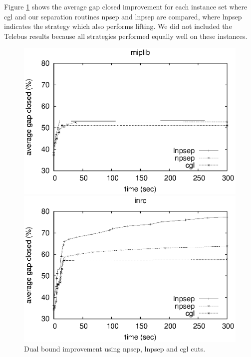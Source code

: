 \documentclass{endm}
\begin{document}
Figure \ref{figExperiments} shows the average gap closed improvement for each instance set where cgl and our separation routines npsep and lnpsep are compared, where lnpsep indicates the strategy which also performs lifting. We did not included the Telebus results because all strategies performed equally well on these instances.

\begin{figure}	
	\begin{minipage}[h]{.5\textwidth}
		\begin{center}
			\includegraphics[width=1\textwidth]{miplib.eps}
		\end{center}
	\end{minipage}
	\begin{minipage}[h]{.5\textwidth}
		\begin{center}
			\includegraphics[width=1\textwidth]{nurse.eps}
		\end{center}
	\end{minipage}
	\caption{Dual bound improvement using npsep, lnpsep and cgl cuts.}
	\label{figExperiments}
\end{figure}
\end{document}

